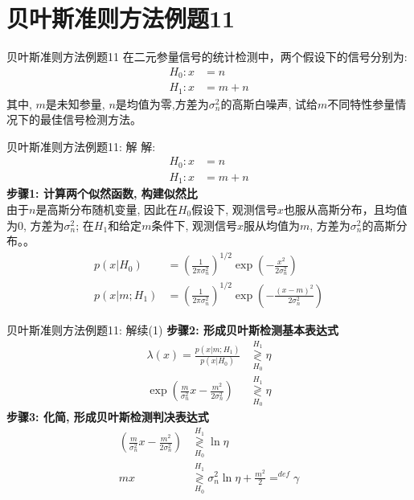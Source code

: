 \section{贝叶斯准则方法例题11}

\begin{frame}{贝叶斯准则方法例题11}
在二元参量信号的统计检测中，两个假设下的信号分别为:
\begin{align*}
H_0: x&=n  \\
H_1: x&=m+n
\end{align*}
其中, $m$是未知参量, $n$是均值为零,方差为$\sigma_n^2$的高斯白噪声,  试给$m$不同特性参量情况下的最佳信号检测方法。
\end{frame}

\begin{frame}[shrink]{贝叶斯准则方法例题11: 解}
解: 
\begin{align*}
H_0: x&=n\\
H_1: x&=m+n
\end{align*}
\textbf{步骤1: 计算两个似然函数, 构建似然比}\\
由于$n$是高斯分布随机变量, 因此在$H_0$假设下, 观测信号$x$也服从高斯分布，且均值为0, 方差为$\sigma_n^2$; 在$H_1$和给定$m$条件下, 观测信号$x$服从均值为$m$, 方差为$\sigma_n^2$的高斯分布。。
\begin{align*}
p(x|H_0)&=\left(\frac{1}{2\pi\sigma_n^2}\right)^{1/2}\exp\left(-\frac{x^2}{2\sigma_n^2}\right)\\
p(x|m; H_1)&=\left(\frac{1}{2\pi\sigma_n^2}\right)^{1/2}\exp\left(-\frac{(x-m)^2}{2\sigma_n^2}\right)
\end{align*} 
\end{frame}

\begin{frame}[shrink]{贝叶斯准则方法例题11: 解续(1)}
\textbf{步骤2: 形成贝叶斯检测基本表达式}
\begin{align*}
\lambda(x)=\frac{p(x|m; H_1)}{p(x|H_0)}&\mathop{\gtrless}\limits_{H_0}^{H_1}\eta\\
\exp\left(\frac{m}{\sigma_n^2}x-\frac{m^2}{2\sigma_n^2}\right)&\mathop{\gtrless}\limits_{H_0}^{H_1}\eta
\end{align*} 
\textbf{步骤3: 化简, 形成贝叶斯检测判决表达式}
\begin{align*}
\left(\frac{m}{\sigma_n^2}x-\frac{m^2}{2\sigma_n^2}\right)&\mathop{\gtrless}\limits_{H_0}^{H_1}\ln\eta\\
mx&\mathop{\gtrless}\limits_{H_0}^{H_1}\sigma_n^2\ln\eta+\frac{m^2}{2}\mathop{=}^{def}\gamma
\end{align*}
\end{frame}

